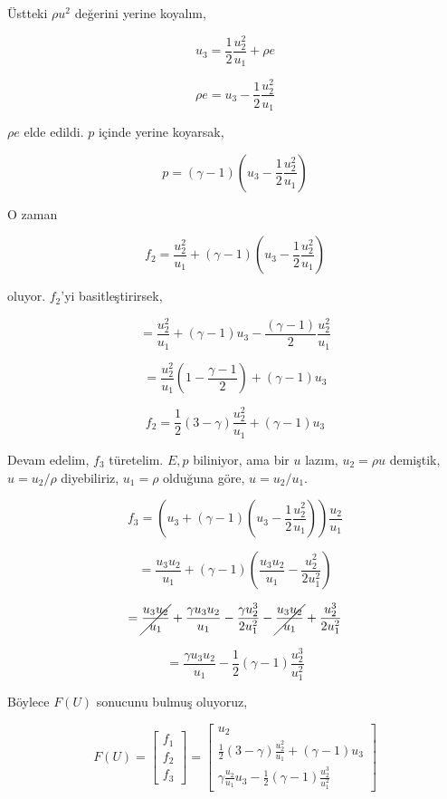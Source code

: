 \documentclass[12pt,fleqn]{article}\usepackage{../../common}
\begin{document}
Üstteki $\rho u^2$ değerini yerine koyalım,

$$
u_3 = \frac{1}{2} \frac{u_2^2}{u_1} + \rho e
$$

$$
\rho e = u_3 - \frac{1}{2} \frac{u_2^2}{u_1} 
$$

$\rho e$ elde edildi. $p$ içinde yerine koyarsak,

$$
p = (\gamma - 1) \left(  u_3 - \frac{1}{2} \frac{u_2^2}{u_1}   \right)
$$

O zaman

$$
f_2 = \frac{u_2^2}{u_1} +  (\gamma - 1) \left(  u_3 - \frac{1}{2} \frac{u_2^2}{u_1}   \right)
$$

oluyor. $f_2$'yi basitleştirirsek,

$$
= \frac{u_2^2}{u_1} + (\gamma - 1)u_3 - \frac{(\gamma-1)}{2} \frac{u_2^2}{u_1}
$$

$$
= \frac{u_2^2}{u_1} \left( 1 - \frac{\gamma-1}{2}  \right) + (\gamma - 1)u_3
$$

$$
f_2 = \frac{1}{2} (3-\gamma) \frac{u_2^2}{u_1} + (\gamma - 1)u_3
$$

Devam edelim, $f_3$ türetelim. $E,p$ biliniyor, ama bir $u$ lazım,
$u_2 = \rho u$ demiştik, $u = u_2 / \rho$ diyebiliriz, $u_1 = \rho$
olduğuna göre, $u = u_2 / u_1$.

$$
f_3 =  \left(
  u_3 + (\gamma - 1) ( u_3 - \frac{1}{2} \frac{u_2^2}{u_1})
\right) \frac{u_2}{u_1}
$$

$$
= \frac{u_3 u_2}{u_1} + (\gamma - 1) \left(
  \frac{u_3 u_2}{u_1} - \frac{u_2^2}{2u_1^2}
\right)
$$

$$
= \cancel{\frac{u_3 u_2}{u_1}} +
\frac{\gamma u_3 u_2}{u_1} -
\frac{\gamma u_2^3}{2u_1^2} -
\cancel{\frac{u_3 u_2}{u_1}} +
\frac{u_2^3}{2 u_1^2}
$$

$$
= \frac{\gamma u_3 u_2}{u_1} - \frac{1}{2} (\gamma - 1) \frac{u_2^3}{u_1^2}
$$

Böylece $F(U)$ sonucunu bulmuş oluyoruz, 

$$
F(U) =
\left[\begin{array}{c}
f_1 \\ f_2  \\ f_3
\end{array}\right] =
\left[\begin{array}{c}
u_2 \\
\frac{1}{2} (3-\gamma) \frac{u_2^2}{u_1} + (\gamma - 1)u_3 \\
\gamma \frac{u_2}{u_1} u_3 - \frac{1}{2} (\gamma - 1)\frac{u_2^3}{u_1^2}
\end{array}\right] 
$$
\end{document}
